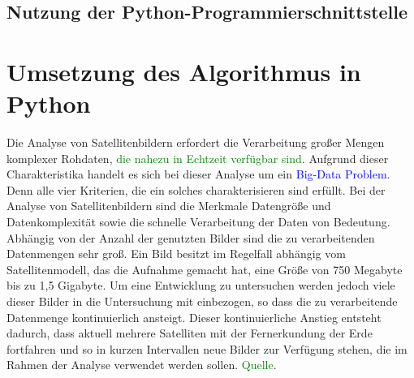 \subsection{Nutzung der Python-Programmierschnittstelle}
\section{Umsetzung des Algorithmus in Python}
Die Analyse von Satellitenbildern erfordert die Verarbeitung großer Mengen komplexer Rohdaten, \textcolor{green}{die nahezu in Echtzeit verfügbar sind}. Aufgrund dieser Charakteristika handelt es sich bei dieser Analyse um ein \textcolor{blue}{Big-Data Problem}. Denn alle vier Kriterien, die ein solches charakterisieren sind erfüllt.
\newline
Bei der Analyse von Satellitenbildern sind die Merkmale Datengröße und Datenkomplexität sowie die schnelle Verarbeitung der Daten von Bedeutung. Abhängig von der Anzahl der genutzten Bilder sind die zu verarbeitenden Datenmengen sehr groß. Ein Bild besitzt im Regelfall abhängig vom Satellitenmodell, das die Aufnahme gemacht hat, eine Größe von 750 Megabyte bis zu 1,5 Gigabyte. Um eine Entwicklung zu untersuchen werden jedoch viele dieser Bilder in die Untersuchung mit einbezogen, so dass die zu verarbeitende Datenmenge kontinuierlich ansteigt. Dieser kontinuierliche Anstieg entsteht dadurch, dass aktuell mehrere Satelliten mit der Fernerkundung der Erde fortfahren und so in kurzen Intervallen neue Bilder zur Verfügung stehen, die im Rahmen der Analyse verwendet werden sollen. \textcolor{green}{Quelle}.

